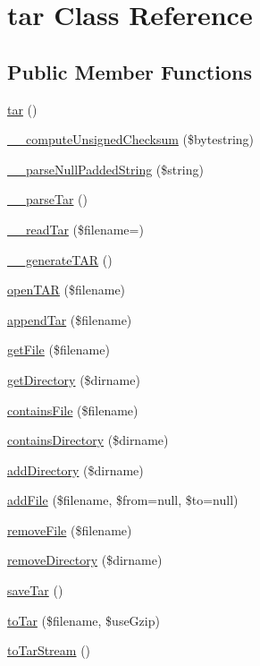 \hypertarget{classtar}{}\section{tar Class Reference}
\label{classtar}
\subsection*{Public Member Functions}
\begin{DoxyCompactItemize}
\item 
\hyperlink{classtar_a310c3cc3417ea0fdb5c1c96cc5b47efa}{tar} ()
\item 
\hyperlink{classtar_a2f9a99c49a3ab86475a1cd26e722c0fa}{\+\_\+\+\_\+compute\+Unsigned\+Checksum} (\$bytestring)
\item 
\hyperlink{classtar_ab9d60205cd0862d6d3cfb582b43a3288}{\+\_\+\+\_\+parse\+Null\+Padded\+String} (\$string)
\item 
\hyperlink{classtar_a8d8793668fa7e2de0beb4dca399ee3ed}{\+\_\+\+\_\+parse\+Tar} ()
\item 
\hyperlink{classtar_a1422972f8f5afac82f82ecab505b4079}{\+\_\+\+\_\+read\+Tar} (\$filename=\textquotesingle{}\textquotesingle{})
\item 
\hyperlink{classtar_a97fd04b02c85bbb3eb588a160237f375}{\+\_\+\+\_\+generate\+T\+AR} ()
\item 
\hyperlink{classtar_a62fc429d1e33de90d1ce65c3c16a4193}{open\+T\+AR} (\$filename)
\item 
\hyperlink{classtar_a3c35ee6b05a860a0108afa5853db4070}{append\+Tar} (\$filename)
\item 
\hyperlink{classtar_a8eb93e97f657daf1a3671c60f7093745}{get\+File} (\$filename)
\item 
\hyperlink{classtar_a02157ed6604bec5f931ad08d1c5c048f}{get\+Directory} (\$dirname)
\item 
\hyperlink{classtar_ac7ba975f7bcf57d9a8167feb7122933e}{contains\+File} (\$filename)
\item 
\hyperlink{classtar_aff90f763b61b935c856eb7e634a2c0a7}{contains\+Directory} (\$dirname)
\item 
\hyperlink{classtar_a046188f5c3141d52246774c13ab2c895}{add\+Directory} (\$dirname)
\item 
\hyperlink{classtar_a374a307255a5fc5110749b1e37946947}{add\+File} (\$filename, \$from=null, \$to=null)
\item 
\hyperlink{classtar_a51cd4b11f9e4e6c9c5c0bc93d5a063c7}{remove\+File} (\$filename)
\item 
\hyperlink{classtar_a17971edb42a8be66b554ca5d6cf6bc1e}{remove\+Directory} (\$dirname)
\item 
\hyperlink{classtar_ac70edc9fc85a3106aaa3c07a3a57a0a2}{save\+Tar} ()
\item 
\hyperlink{classtar_acfe90e92d12e463da735e3c42e5a74f1}{to\+Tar} (\$filename, \$use\+Gzip)
\item 
\hyperlink{classtar_a347041e79cbe8f150933afe77f35826f}{to\+Tar\+Stream} ()
\end{DoxyCompactItemize}
